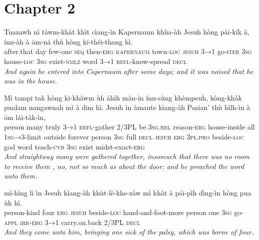 \documentclass[11pt,a4paper]{article}
\begin{document}
\section*{Chapter 2}

\begin{exe}
\gll Tuazawh nì tàwm-khàt khìt cìang-ìn Kapernaum khùa-àh Jesuh hòng pái-kík à, ínn-àh à ōm-ná thù hòng kī-théi-thang hì. \\
     after.that day few-one \textsc{seq} then-\textsc{erg} \textsc{kapernaum} town-\textsc{loc} \textsc{jesuh} \textsc{3→1} go-\textsc{iter} \textsc{3sg} house-\textsc{loc} \textsc{3sg} exist-\textsc{nmlz} word \textsc{3→1} \textsc{refl}-know-spread \textsc{decl} \\
\glt \textcolor{kjvcolor}{\textit{And again he entered into Capernaum after some days; and it was noised that he was in the house.}}

\gll Mì tampi tak hòng kī-khàwm ùh àhìh màn-ìn ínn-sùng khèmpeuh, kòng-khàk pualam nangawnah mì à dim hì. Jesuh ìn àmaute kìang-àh Pasian' thù hìlh-ìn à ōm lái-tàk-ìn, \\
     person many truly \textsc{3→1} \textsc{refl}-gather 2/3PL be.\textsc{3sg}.\textsc{rel} reason-\textsc{erg} house-inside all \textsc{1sg→3}-limit outside forever person \textsc{3sg} full \textsc{decl} \textsc{jesuh} \textsc{erg} \textsc{3pl}.\textsc{pro} beside-\textsc{loc} god word teach-\textsc{cvb} \textsc{3sg} exist midst-exact-\textsc{erg} \\
\glt \textcolor{kjvcolor}{\textit{And straightway many were gathered together, insomuch that there was no room to receive them , no, not so much as about the door: and he preached the word unto them.}}

\gll mì-hìng li ìn Jesuh kìang-àh khùt-lè-khe-zàw mì khàt à pái-pìh dìng-ìn hòng pua ùh hì. \\
     person-kind four \textsc{erg} \textsc{jesuh} beside-\textsc{loc} hand-and-foot-more person one \textsc{3sg} go-\textsc{appl} \textsc{irr}-\textsc{erg} \textsc{3→1} carry.on.back 2/3PL \textsc{decl} \\
\glt \textcolor{kjvcolor}{\textit{And they come unto him, bringing one sick of the palsy, which was borne of four.}}


\end{exe}
\end{document}
